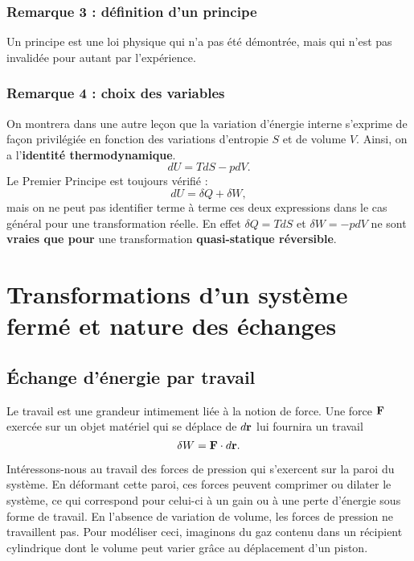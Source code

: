 \documentclass[11pt,a4paper]{report}
\begin{document}
\subsubsection{Remarque 3 : définition d'un principe}
Un principe est une loi physique qui n'a pas été démontrée, mais qui n'est pas invalidée pour autant par l'expérience.

\subsubsection{Remarque 4 : choix des variables}
On montrera dans une autre leçon que la variation d'énergie interne s'exprime de façon privilégiée en fonction des variations d'entropie $S$ et de volume $V$. Ainsi, on a l'\textbf{identité thermodynamique}.
\begin{equation}
	dU = TdS - pdV.
\end{equation}
Le Premier Principe est toujours vérifié :
\begin{equation}
	dU = \delta Q + \delta W,
\end{equation}
mais on ne peut pas identifier terme à terme ces deux expressions dans le cas général pour une transformation réelle. En effet $\delta Q = T dS$ et $\delta W = - pdV$ ne sont \textbf{vraies que pour} une transformation \textbf{quasi-statique réversible}.

\newpage
\section{Transformations d'un système fermé et nature des échanges}

\subsection{\'Echange d'énergie par travail}

Le travail est une grandeur intimement liée à la notion de force. Une force $\bold{F}$ exercée sur un objet matériel qui se déplace de $d\bold{r}$ lui fournira un travail
\begin{equation}
	\delta W = \bold{F}\cdot d\bold{r}.
\end{equation}

Intéressons-nous au travail des forces de pression qui s'exercent sur la paroi du système. En déformant cette paroi, ces forces peuvent comprimer ou dilater le système, ce qui correspond pour celui-ci à un gain ou à une perte d'énergie sous forme de travail. En l'absence de variation de volume, les forces de pression ne travaillent pas. Pour modéliser ceci, imaginons du gaz contenu dans un récipient cylindrique dont le volume peut varier grâce au déplacement d'un piston.
\end{document}
